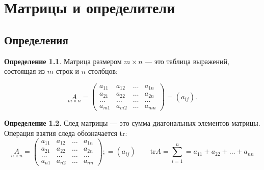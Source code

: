\documentclass[a5paper, 11pt]{extbook}
\author{Daniil Shvalov}
\date{\today}
\title{}
\theoremstyle{definition}
\theoremstyle{definition}
\newtheorem{definition}{Определение}[chapter]
\begin{document}
\tableofcontents


\hypersetup{linktoc = all, colorlinks = true, urlcolor = DodgerBlue4, citecolor = PaleGreen1, linkcolor = blue}

\makeatletter
\def\thm@space@setup{\thm@preskip=1pt
    \thm@postskip=1pt}
\makeatother

\def\lets{%
    \mathord{\setbox0=\hbox{$\exists$}%
        \hbox{\kern 0.125\wd0%
            \vbox to \ht0{%
                \hrule width 0.75\wd0%
                \vfill%
                \hrule width 0.75\wd0}%
            \vrule height \ht0%
            \kern 0.125\wd0}%
    }%
}


\chapter{Матрицы и определители}
\label{sec:org37c4e21}
\section{Определения}
\label{sec:orgc3e0aac}
\begin{definition}
    Матрица размером \(m \times n\) — это таблица выражений, состоящая из \(m\) строк и \(n\) столбцов:

    \begin{equation*}
        \underset{m \times n}{A} =
        \begin{pmatrix}
            a_{11} & a_{12} & \ldots & a_{1n} \\
            a_{21} & a_{22} & \ldots & a_{2n} \\
            \ldots & \ldots & \ldots & \ldots \\
            a_{m1} & a_{m2} & \ldots & a_{mn}
        \end{pmatrix}
        = (a_{ij}).
    \end{equation*}
\end{definition}

\begin{definition}
    След матрицы — это сумма диагональных элементов матрицы. Операция взятия следа обозначается \(\mathrm{tr}\):
    \begin{equation*}
        \underset{n \times n}{A} =
        \begin{pmatrix}
            a_{11} & a_{12} & \ldots & a_{1n} \\
            a_{21} & a_{22} & \ldots & a_{2n} \\
            \ldots & \ldots & \ldots & \ldots \\
            a_{n1} & a_{n2} & \ldots & a_{nn}
        \end{pmatrix};
        = (a_{ij})
        \qquad
        \mathrm{tr} A = \sum_{i = 1}^n = a_{11} + a_{22} + \ldots + a_{nn}
    \end{equation*}
\end{definition}
\end{document}
